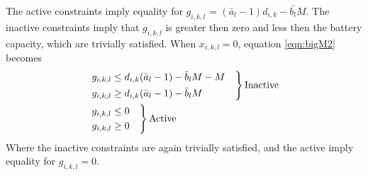 The active constraints imply equality for $g_{i,k,l}$ = $(\bar{a}_l - 1)d_{i,k} - \bar{b_l}M$.  The inactive constraints imply that $g_{i,k,l}$ is greater then zero and less then the battery capacity, which are trivially satisfied. When $x_{i,k,l} = 0$, equation \ref{eqn:bigM2} becomes
\begin{equation}
	\begin{aligned}
		& \begin{rcases}
			g_{i,k,l} \le d_{i,k}(\bar{a}_l - 1) - \bar{b}_lM - M &\\
			g_{i,k,l} \ge d_{i,k}(\bar{a}_l - 1) - \bar{b}_lM &\\
		\end{rcases} \text{Inactive} \\
		& \begin{rcases}
			g_{i,k,l}\le 0 & \\
			g_{i,k,l}\ge 0 & \\ 
		\end{rcases}\text{Active}\\
	\end{aligned}
\end{equation}
Where the inactive constraints are again trivially satisfied, and the active imply equality for $g_{i,k,l} = 0$.

